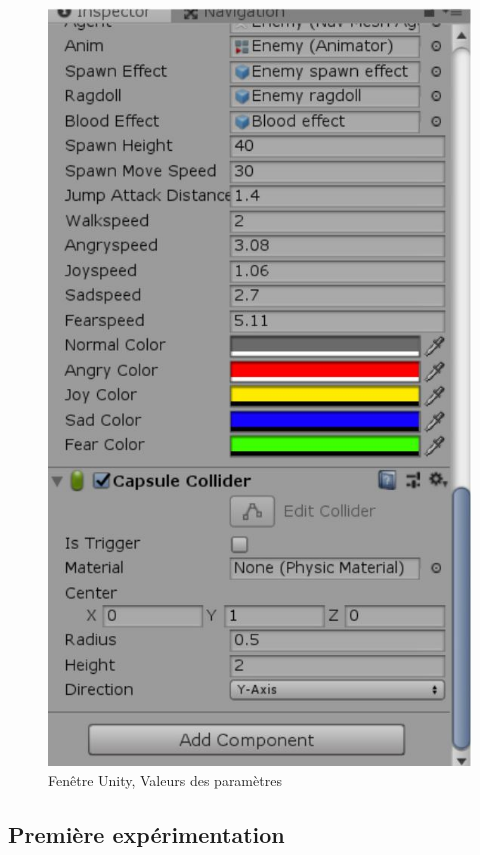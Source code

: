 \begin{figure}[th]
\centering
\includegraphics{Figures/751unity.JPG}
\decoRule
\caption[Fenêtre Unity]{Fenêtre Unity, Valeurs des paramètres}
\label{fig:751}
\end{figure}


\subsection{Première expérimentation}

